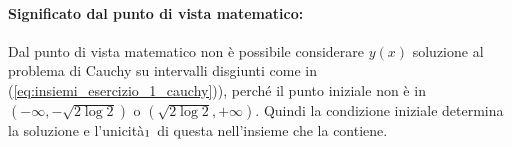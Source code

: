 \begin{example}
    \paragraph{Significato dal punto di vista matematico:} Dal punto di vista matematico non è possibile considerare $y(x)$ soluzione al problema di Cauchy su intervalli disgiunti come in (\ref{eq:insiemi_esercizio_1_cauchy})), perché il punto iniziale non è in $(-\infty, -\sqrt{2\log2})$ o $ (\sqrt{2\log2}, +\infty)$. Quindi la condizione iniziale determina la soluzione e l'unicità$_{\footnotemark}$ di questa nell'insieme che la contiene.
\end{example}

